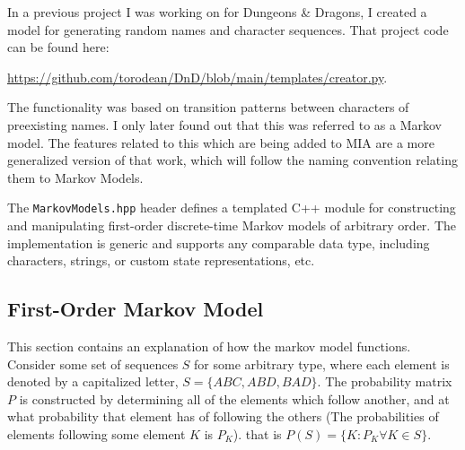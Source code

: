 In a previous project I was working on for Dungeons \& Dragons, I created a model for generating random names and character sequences. That project code can be found here: 
\begin{center}
\url{https://github.com/torodean/DnD/blob/main/templates/creator.py}. 
\end{center}
The functionality was based on transition patterns between characters of preexisting names. I only later found out that this was referred to as a Markov model. The features related to this which are being added to MIA are a more generalized version of that work, which will follow the naming convention relating them to Markov Models.

The \texttt{MarkovModels.hpp} header defines a templated C++ module for constructing and manipulating first-order discrete-time Markov models of arbitrary order. The implementation is generic and supports any comparable data type, including characters, strings, or custom state representations, etc.

\subsection{First-Order Markov Model}

This section contains an explanation of how the markov model functions. Consider some set of sequences $S$ for some arbitrary type, where each element is denoted by a capitalized letter, $S=\{ABC, ABD, BAD\}$. The probability matrix $P$ is constructed by determining all of the elements which follow another, and at what probability that element has of following the others (The probabilities of elements following some element $K$ is $P_K$). that is $P(S) = \{K:P_K \forall K \in S\}$.

